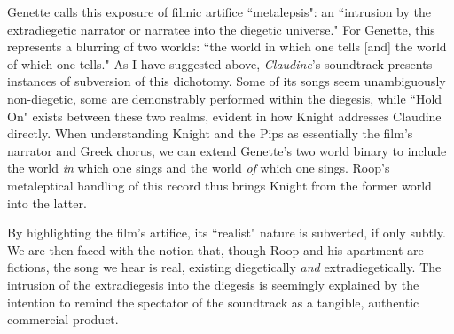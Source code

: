 Genette calls this exposure of filmic artifice ``metalepsis": an ``intrusion by the extradiegetic narrator or narratee into the diegetic universe."\autocite[Genette adds that this ``intrusion" can also occur in the opposite direction. Although his focus is on literature, his terminology remains useful in this instance, particularly when understanding Knight's voice as akin to a narrator.][234-235]{genette_narrative_1980}
For Genette, this represents a blurring of two worlds: ``the world in which one tells [and] the world of which one tells."\autocite[][236]{genette_narrative_1980}
As I have suggested above, \textit{Claudine}'s soundtrack presents instances of subversion of this dichotomy.
Some of its songs seem unambiguously non-diegetic, some are demonstrably performed within the diegesis, while ``Hold On" exists between these two realms, evident in how Knight addresses Claudine directly.
When understanding Knight and the Pips as essentially the film's narrator and Greek chorus, we can extend Genette's two world binary to include the world \textit{in} which one sings and the world \textit{of} which one sings.
Roop's metaleptical handling of this record thus brings Knight from the former world into the latter.

By highlighting the film's artifice, its ``realist" nature is subverted, if only subtly. 
We are then faced with the notion that, though Roop and his apartment are fictions, the song we hear is real, existing diegetically \textit{and} extradiegetically.
The intrusion of the extradiegesis into the diegesis is seemingly explained by the intention to remind the spectator of the soundtrack as a tangible, authentic commercial product.






